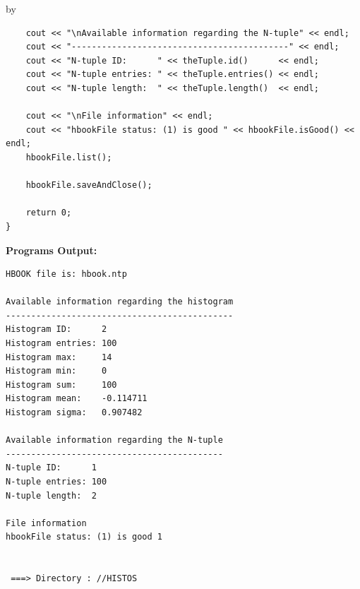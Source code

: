 \documentclass[twoside]{article}
\newcommand{\entrylabel}[1]{\mbox{\textbf{{#1}}}\hfil}%
\newenvironment{entry}
{\begin{list}{}%
    {\renewcommand{\makelabel}{\entrylabel}%
     \setlength{\labelwidth}{90pt}%
     \setlength{\leftmargin}{\labelwidth}
     \advance\leftmargin by \labelsep%
      }%
    }%
  {\end{list}}
\newcommand{\Entrylabel}[1]%
{\raisebox{0pt}[1ex][0pt]{\makebox[\labelwidth][l]%
    {\parbox[t]{\labelwidth}{\hspace{0pt}\textbf{{#1}}}}}}
\newenvironment{Entry}%
{\renewcommand{\entrylabel}{\Entrylabel}\begin{entry}}%
  {\end{entry}}
\begin{document}
\begin{Entry}
{\begin{verbatim}
    cout << "\nAvailable information regarding the N-tuple" << endl;
    cout << "-------------------------------------------" << endl;
    cout << "N-tuple ID:      " << theTuple.id()      << endl;
    cout << "N-tuple entries: " << theTuple.entries() << endl;
    cout << "N-tuple length:  " << theTuple.length()  << endl;

    cout << "\nFile information" << endl;
    cout << "hbookFile status: (1) is good " << hbookFile.isGood() << endl;
    hbookFile.list();
    
    hbookFile.saveAndClose();

    return 0;
}
\end{verbatim}
}%
{\bf Programs Output:}
{\footnotesize
\begin{verbatim}
HBOOK file is: hbook.ntp

Available information regarding the histogram
---------------------------------------------
Histogram ID:      2
Histogram entries: 100
Histogram max:     14
Histogram min:     0
Histogram sum:     100
Histogram mean:    -0.114711
Histogram sigma:   0.907482

Available information regarding the N-tuple
-------------------------------------------
N-tuple ID:      1
N-tuple entries: 100
N-tuple length:  2

File information
hbookFile status: (1) is good 1


 ===> Directory : //HISTOS
\end{verbatim}
} %
\end{Entry}

\clearpage
  
  
%
%
\end{document}
